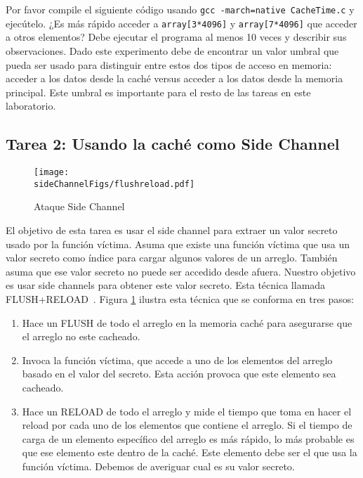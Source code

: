 Por favor compile el siguiente código usando \texttt{gcc -march=native
CacheTime.c} y ejecútelo. ¿Es más rápido acceder a \texttt{array[3*4096]} y \texttt{array[7*4096]} que acceder a otros elementos? Debe ejecutar el programa al menos 10 veces y describir sus observaciones. Dado este experimento debe de encontrar un valor umbral que pueda ser usado para distinguir entre estos dos tipos de acceso en memoria: acceder a los datos desde la caché versus acceder a los datos desde la memoria principal. Este umbral es importante para el resto de las tareas en este laboratorio.

\subsection{Tarea 2: Usando la caché como Side Channel}


\begin{figure}[htb]
\centering
\texttt{[image: \\sideChannelFigs/flushreload.pdf]}
\caption{Ataque Side Channel}
\label{sidechannel:fig:flushreload}
\end{figure}

El objetivo de esta tarea es usar el side channel para extraer un valor secreto usado por la función víctima. Asuma que existe una función víctima que usa un valor secreto como índice para cargar algunos valores de un arreglo. También asuma que ese valor secreto no puede ser accedido desde afuera. Nuestro objetivo es usar side channels para obtener este valor secreto. Esta técnica llamada FLUSH+RELOAD~\cite{Yarom2014}. Figura \ref{sidechannel:fig:flushreload} ilustra esta técnica que se conforma en tres pasos:

\begin{enumerate}[noitemsep]

\item Hace un FLUSH de todo el arreglo en la memoria caché para asegurarse que el arreglo no este cacheado.

\item Invoca la función víctima, que accede a uno de los elementos del arreglo basado en el valor del secreto. Esta acción provoca que este elemento sea cacheado.

\item Hace un RELOAD de todo el arreglo y mide el tiempo que toma en hacer el reload por cada uno de los elementos que contiene el arreglo. Si el tiempo de carga de un elemento específico del arreglo es más rápido, lo más probable es que ese elemento este dentro de la caché.
Este elemento debe ser el que usa la función víctima. 
Debemos de averiguar cual es su valor secreto.
\end{enumerate}

